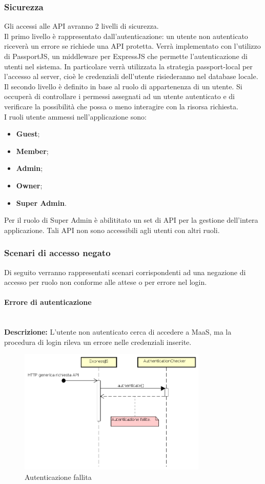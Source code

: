 \subsubsection{Sicurezza}
Gli accessi alle API avranno 2 livelli di sicurezza. \\
Il primo livello è rappresentato dall'autenticazione: un utente non autenticato riceverà un errore se richiede una API protetta. Verrà implementato con l'utilizzo di PassportJS, un middleware per ExpressJS che permette l'autenticazione di utenti nel sistema. In particolare verrà utilizzata la strategia passport-local per l'accesso al server, cioè le credenziali dell'utente risiederanno nel database locale. \\
Il secondo livello è definito in base al ruolo di appartenenza di un utente. Si occuperà di controllare i permessi assegnati ad un utente autenticato e di verificare la possibilità che possa o meno interagire con la risorsa richiesta. \\
I ruoli utente ammessi nell'applicazione sono: 
\begin{itemize}
\item \textbf{Guest};
\item \textbf{Member};
\item \textbf{Admin};
\item \textbf{Owner};
\item \textbf{Super Admin}.
\end{itemize}
Per il ruolo di Super Admin è abilititato un set di API per la gestione dell'intera applicazione. Tali API non sono accessibili agli utenti con altri ruoli.
\newpage
\subsubsection{Scenari di accesso negato}
Di seguito verranno rappresentati scenari corrispondenti ad una negazione di accesso per ruolo non conforme alle attese o per errore nel login.
\paragraph{Errore di autenticazione}  \mbox{} \\
\textbf{Descrizione:} L'utente non autenticato cerca di accedere a MaaS, ma la procedura di login rileva un errore nelle credenziali inserite.
\begin{figure}[H]
\centering
\includegraphics[width=0.8\textwidth]{res/sections/backend/sequence/autenticazioneFallita.png}
\caption{Autenticazione fallita}
\end{figure}
